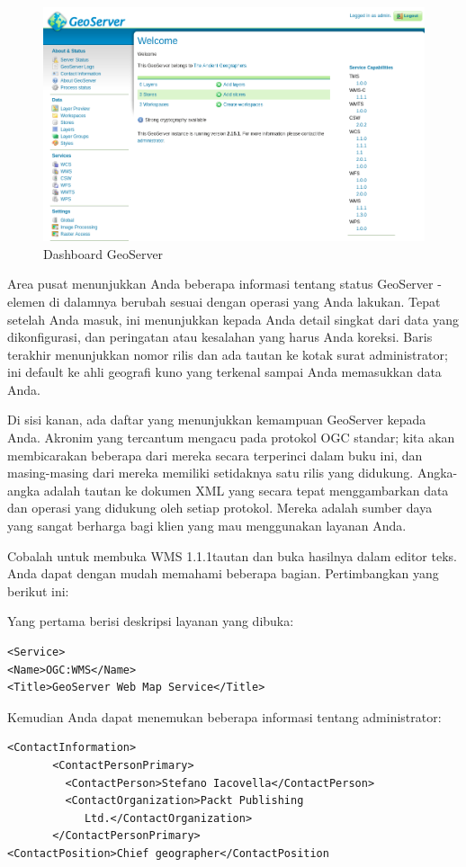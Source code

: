 \documentclass[]{book}
\begin{document}
\begin{figure}

{\centering \includegraphics[width=0.6\linewidth]{images/08/gs3} 

}

\caption{Dashboard GeoServer}\label{fig:fig74}
\end{figure}

Area pusat menunjukkan Anda beberapa informasi tentang status GeoServer - elemen di dalamnya berubah sesuai dengan operasi yang Anda lakukan. Tepat setelah Anda masuk, ini menunjukkan kepada Anda detail singkat dari data yang dikonfigurasi, dan peringatan atau kesalahan yang harus Anda koreksi. Baris terakhir menunjukkan nomor rilis dan ada tautan ke kotak surat administrator; ini default ke ahli geografi kuno yang terkenal sampai Anda memasukkan data Anda.

Di sisi kanan, ada daftar yang menunjukkan kemampuan GeoServer kepada Anda. Akronim yang tercantum mengacu pada protokol OGC standar; kita akan membicarakan beberapa dari mereka secara terperinci dalam buku ini, dan masing-masing dari mereka memiliki setidaknya satu rilis yang didukung. Angka-angka adalah tautan ke dokumen XML yang secara tepat menggambarkan data dan operasi yang didukung oleh setiap protokol. Mereka adalah sumber daya yang sangat berharga bagi klien yang mau menggunakan layanan Anda.

Cobalah untuk membuka WMS 1.1.1tautan dan buka hasilnya dalam editor teks. Anda dapat dengan mudah memahami beberapa bagian. Pertimbangkan yang berikut ini:

Yang pertama berisi deskripsi layanan yang dibuka:

\begin{verbatim}
<Service> 
<Name>OGC:WMS</Name> 
<Title>GeoServer Web Map Service</Title>
\end{verbatim}

Kemudian Anda dapat menemukan beberapa informasi tentang administrator:

\begin{verbatim}
<ContactInformation> 
       <ContactPersonPrimary> 
         <ContactPerson>Stefano Iacovella</ContactPerson> 
         <ContactOrganization>Packt Publishing  
            Ltd.</ContactOrganization> 
       </ContactPersonPrimary> 
<ContactPosition>Chief geographer</ContactPosition
\end{verbatim}
\end{document}
